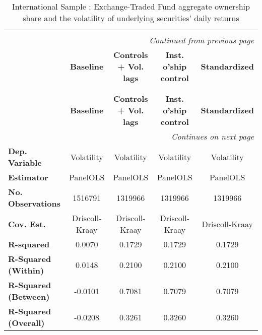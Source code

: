 {\small
  \begin{center}
    \begin{longtable}{lcccc}
      \linespread{1.0}\\
      \multicolumn{5}{r}{\textit{Continued from previous page}}\\
      \toprule
      & \textbf{Baseline}  & \textbf{Controls + Vol. lags} & \textbf{Inst. o'ship control} & \textbf{Standardized}  \\
      \midrule
      \endhead
      \caption{International Sample : Exchange-Traded Fund aggregate ownership share and the volatility of underlying securities' daily returns}\\
      \label{tab:Volatility:Intl:Comp}\\
      \toprule
      & \textbf{Baseline}  & \textbf{Controls + Vol. lags} & \textbf{Inst. o'ship control} & \textbf{Standardized}  \\
      \midrule
      \endfirsthead
      \bottomrule
      \multicolumn{5}{r}{\textit{Continues on next page}}\\
      \endfoot
      \bottomrule
      \endlastfoot
      \textbf{Dep. Variable}                     &     Volatility     &           Volatility          &           Volatility          &       Volatility       \\
      \textbf{Estimator}                         &      PanelOLS      &            PanelOLS           &            PanelOLS           &        PanelOLS        \\
      \textbf{No. Observations}                  &      1516791       &            1319966            &            1319966            &        1319966         \\
      \textbf{Cov. Est.}                         &   Driscoll-Kraay   &         Driscoll-Kraay        &         Driscoll-Kraay        &     Driscoll-Kraay     \\
      \textbf{R-squared}                         &       0.0070       &             0.1729            &             0.1729            &         0.1729         \\
      \textbf{R-Squared (Within)}                &       0.0148       &             0.2100            &             0.2100            &         0.2100         \\
      \textbf{R-Squared (Between)}               &      -0.0101       &             0.7081            &             0.7079            &         0.7079         \\
      \textbf{R-Squared (Overall)}               &      -0.0208       &             0.3261            &             0.3260            &         0.3260         \\

\end{longtable}
\end{center}}
